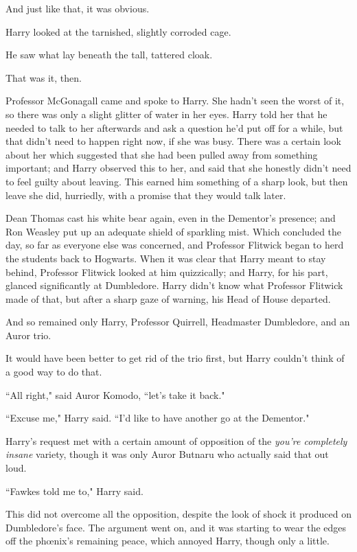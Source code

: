 And just like that, it was obvious.

Harry looked at the tarnished, slightly corroded cage.

He saw what lay beneath the tall, tattered cloak.

That was it, then.

Professor McGonagall came and spoke to Harry. She hadn't seen the worst of it, so there was only a slight glitter of water in her eyes. Harry told her that he needed to talk to her afterwards and ask a question he'd put off for a while, but that didn't need to happen right now, if she was busy. There was a certain look about her which suggested that she had been pulled away from something important; and Harry observed this to her, and said that she honestly didn't need to feel guilty about leaving. This earned him something of a sharp look, but then leave she did, hurriedly, with a promise that they would talk later.

Dean Thomas cast his white bear again, even in the Dementor's presence; and Ron Weasley put up an adequate shield of sparkling mist. Which concluded the day, so far as everyone else was concerned, and Professor Flitwick began to herd the students back to Hogwarts. When it was clear that Harry meant to stay behind, Professor Flitwick looked at him quizzically; and Harry, for his part, glanced significantly at Dumbledore. Harry didn't know what Professor Flitwick made of that, but after a sharp gaze of warning, his Head of House departed.

And so remained only Harry, Professor Quirrell, Headmaster Dumbledore, and an Auror trio.

It would have been better to get rid of the trio first, but Harry couldn't think of a good way to do that.

``All right," said Auror Komodo, ``let's take it back."

``Excuse me," Harry said. ``I'd like to have another go at the Dementor."

\later

Harry's request met with a certain amount of opposition of the \emph{you're completely insane} variety, though it was only Auror Butnaru who actually said that out loud.

``Fawkes told me to," Harry said.

This did not overcome all the opposition, despite the look of shock it produced on Dumbledore's face. The argument went on, and it was starting to wear the edges off the phœnix's remaining peace, which annoyed Harry, though only a little.

